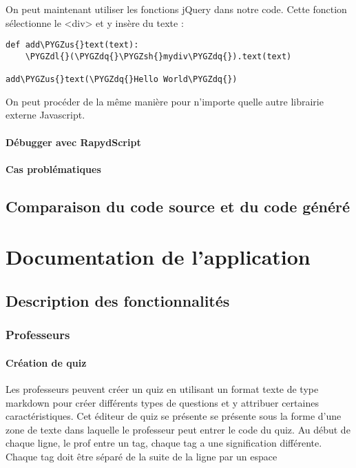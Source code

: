 \documentclass[letterpaper,10pt,french]{sphinxmanual}
\def\PYGZus{\char`\_}
\def\PYGZsh{\char`\#}
\def\PYGZdl{\char`\$}
\def\PYGZdq{\char`\"}
\begin{document}
On peut maintenant utiliser les fonctions jQuery dans notre code. Cette fonction sélectionne le \textless{}div\textgreater{} et y insère du texte :

\begin{Verbatim}[commandchars=\\\{\}]
def add\PYGZus{}text(text):
    \PYGZdl{}(\PYGZdq{}\PYGZsh{}mydiv\PYGZdq{}).text(text)

add\PYGZus{}text(\PYGZdq{}Hello World\PYGZdq{})
\end{Verbatim}

On peut procéder de la même manière pour n'importe quelle autre librairie externe Javascript.


\subsubsection{Débugger avec RapydScript}
\label{rapydscript:debugger-avec-rapydscript}

\subsubsection{Cas problématiques}
\label{rapydscript:cas-problematiques}

\section{Comparaison du code source et du code généré}
\label{rapydscript:comparaison-du-code-source-et-du-code-genere}

\chapter{Documentation de l'application}
\label{documentation::doc}\label{documentation:documentation-de-l-application}

\section{Description des fonctionnalités}
\label{documentation:description-des-fonctionnalites}

\subsection{Professeurs}
\label{documentation:professeurs}

\subsubsection{Création de quiz}
\label{documentation:creation-de-quiz}
Les professeurs peuvent créer un quiz en utilisant un format texte de type markdown pour créer différents types de questions et y attribuer certaines caractéristiques. Cet éditeur de quiz se présente se présente sous la forme d'une zone de texte dans laquelle le professeur peut entrer le code du quiz. Au début de chaque ligne, le prof entre un tag, chaque tag a une signification différente. Chaque tag doit être séparé de la suite de la ligne par un espace
\end{document}
